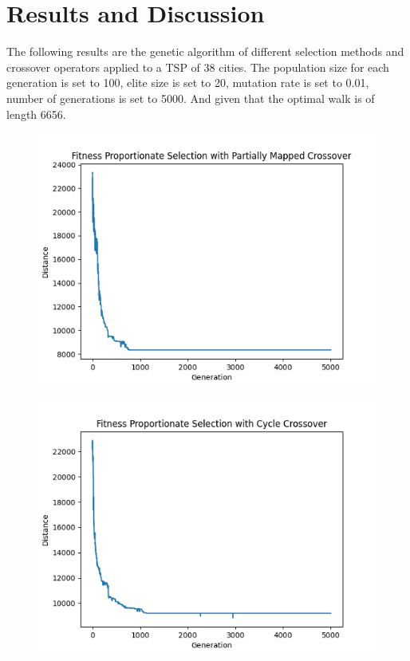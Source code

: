 \documentclass[letterpaper, 12 pt, conference]{ieeeconf}  %
\begin{document}
\section{Results and Discussion}
The following results are the genetic algorithm of different selection methods and crossover operators applied to a TSP of 38 cities.\cite{Uwtsp} The population size for each generation is set to 100, elite size is set to 20, mutation rate is set to 0.01, number of generations is set to 5000. And given that the optimal walk is of length 6656.
\begin{figure}[h!]
    \centering
    \includegraphics{project-style-files/ga1.png}
\end{figure}
\begin{figure}[h!]
    \centering
    \includegraphics{project-style-files/ga2.png}
\end{figure}
\end{document}
